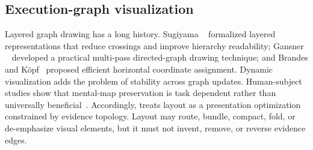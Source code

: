 \subsection{Execution-graph visualization}
Layered graph drawing has a long history. Sugiyama \etal~\cite{sugiyama1981hierarchical} formalized layered representations that reduce crossings and improve hierarchy readability; Gansner \etal~\cite{gansner1993directed} developed a practical multi-pass directed-graph drawing technique; and Brandes and K{\"o}pf~\cite{brandes2002horizontal} proposed efficient horizontal coordinate assignment. Dynamic visualization adds the problem of stability across graph updates. Human-subject studies show that mental-map preservation is task dependent rather than universally beneficial~\cite{archambault2011dynamic,archambault2013mentalmap}. Accordingly, \system treats layout as a presentation optimization constrained by evidence topology. Layout may route, bundle, compact, fold, or de-emphasize visual elements, but it must not invent, remove, or reverse evidence edges.
